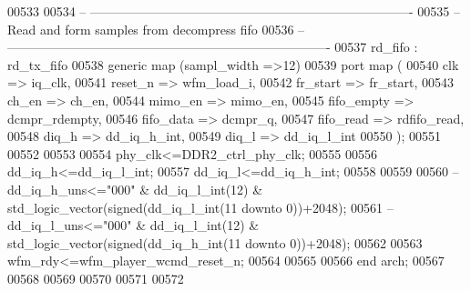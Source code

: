 \begin{DoxyCode}
00533          
00534 \textcolor{keyword}{-- ----------------------------------------------------------------------------}
00535 \textcolor{keyword}{-- Read and form samples from decompress fifo}
00536 \textcolor{keyword}{-- ----------------------------------------------------------------------------         }
00537 rd_fifo : rd_tx_fifo 
00538   \textcolor{keywordflow}{generic} \textcolor{keywordflow}{map} (sampl_width =>\textcolor{vhdllogic}{12}\textcolor{vhdlchar}{)}
00539   \textcolor{keywordflow}{port} \textcolor{keywordflow}{map} (
00540       clk           => iq_clk,
00541       reset_n       => wfm_load_i, 
00542       fr_start      => fr_start, 
00543       ch_en         => ch_en,
00544       mimo_en       => mimo_en,
00545       fifo_empty    => dcmpr_rdempty,
00546       fifo_data => dcmpr_q, 
00547       fifo_read => rdfifo_read, 
00548       diq_h         => dd_iq_h_int, 
00549       diq_l         => dd_iq_l_int
00550         \textcolor{vhdlchar}{)};      
00551 
00552 
00553 
00554 \textcolor{vhdlchar}{phy_clk}\textcolor{vhdlchar}{<=}\textcolor{vhdlchar}{DDR2_ctrl_phy_clk};
00555 
00556 \textcolor{vhdlchar}{dd_iq_h}\textcolor{vhdlchar}{<=}\textcolor{vhdlchar}{dd_iq_l_int};
00557 \textcolor{vhdlchar}{dd_iq_l}\textcolor{vhdlchar}{<=}\textcolor{vhdlchar}{dd_iq_h_int};   
00558 
00559 
00560 \textcolor{keyword}{--dd\_iq\_h\_uns<="000" & dd\_iq\_l\_int(12) & std\_logic\_vector(signed(dd\_iq\_l\_int(11 downto 0))+2048);}
00561 \textcolor{keyword}{--dd\_iq\_l\_uns<="000" & dd\_iq\_l\_int(12) & std\_logic\_vector(signed(dd\_iq\_h\_int(11 downto 0))+2048);}
00562 
00563 \textcolor{vhdlchar}{wfm_rdy}\textcolor{vhdlchar}{<=}\textcolor{vhdlchar}{wfm_player_wcmd_reset_n};
00564 
00565   
00566 \textcolor{keywordflow}{end} \textcolor{vhdlchar}{arch};   
00567 
00568 
00569 
00570 
00571 
00572 
\end{DoxyCode}
